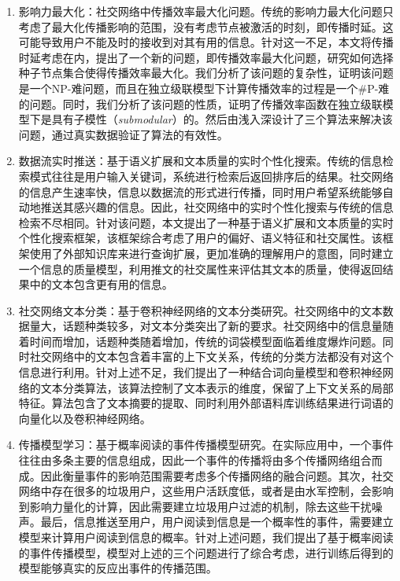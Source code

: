 \begin{enumerate}
	\item 影响力最大化：社交网络中传播效率最大化问题。传统的影响力最大化问题只考虑了最大化传播影响的范围，没有考虑节点被激活的时刻，即传播时延。这可能导致用户不能及时的接收到对其有用的信息。针对这一不足，本文将传播时延考虑在内，提出了一个新的问题，即传播效率最大化问题，研究如何选择种子节点集合使得传播效率最大化。我们分析了该问题的复杂性，证明该问题是一个NP-难问题，而且在独立级联模型下计算传播效率的过程是一个\#P-难的问题。同时，我们分析了该问题的性质，证明了传播效率函数在独立级联模型下是具有子模性（\textit{submodular}）的。然后由浅入深设计了三个算法来解决该问题，通过真实数据验证了算法的有效性。
	\item 数据流实时推送：基于语义扩展和文本质量的实时个性化搜索。传统的信息检索模式往往是用户输入关键词，系统进行检索后返回排序后的结果。社交网络的信息产生速率快，信息以数据流的形式进行传播，同时用户希望系统能够自动地推送其感兴趣的信息。因此，社交网络中的实时个性化搜索与传统的信息检索不尽相同。针对该问题，本文提出了一种基于语义扩展和文本质量的实时个性化搜索框架，该框架综合考虑了用户的偏好、语义特征和社交属性。该框架使用了外部知识库来进行查询扩展，更加准确的理解用户的意图，同时建立一个信息的质量模型，利用推文的社交属性来评估其文本的质量，使得返回结果中的文本包含更有用的信息。
	\item 社交网络文本分类：基于卷积神经网络的文本分类研究。社交网络中的文本数据量大，话题种类较多，对文本分类突出了新的要求。社交网络中的信息量随着时间而增加，话题种类随着增加，传统的词袋模型面临着维度爆炸问题。同时社交网络中的文本包含着丰富的上下文关系，传统的分类方法都没有对这个信息进行利用。针对上述不足，我们提出了一种结合词向量模型和卷积神经网络的文本分类算法，该算法控制了文本表示的维度，保留了上下文关系的局部特征。算法包含了文本摘要的提取、同时利用外部语料库训练结果进行词语的向量化以及卷积神经网络。
	\item 传播模型学习：基于概率阅读的事件传播模型研究。在实际应用中，一个事件往往由多条主要的信息组成，因此一个事件的传播将由多个传播网络组合而成。因此衡量事件的影响范围需要考虑多个传播网络的融合问题。其次，社交网络中存在很多的垃圾用户，这些用户活跃度低，或者是由水军控制，会影响到影响力量化的计算，因此需要建立垃圾用户过滤的机制，除去这些干扰噪声。最后，信息推送至用户，用户阅读到信息是一个概率性的事件，需要建立模型来计算用户阅读到信息的概率。针对上述问题，我们提出了基于概率阅读的事件传播模型，模型对上述的三个问题进行了综合考虑，进行训练后得到的模型能够真实的反应出事件的传播范围。
\end{enumerate}
